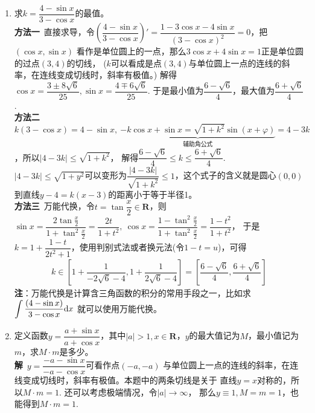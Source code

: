 \begin{enumerate}[label={【\textbf{例\thechapter.\arabic*}】},
 leftmargin=\inteval{\myenumleftmargin}pt,
 itemsep=\inteval{\myenumitempsep}pt,
 itemindent=\inteval{\myenumitemindent}pt]
\item \label{分式三角求值域} 求$ k=\dfrac{4-\sin x}{3-\cos x} $的最值。\\
\textbf{方法一}\ 直接求导，令$ \left(\dfrac{4-\sin x}{3-\cos x}\right)'
=\dfrac{1-3\cos x-4\sin x}{(3-\cos x)^2}=0 $，把$ (\cos x,\sin x) $
看作是单位圆上的一点，那么$ 3\cos x+4\sin x=1 $正是单位圆的过点$ (3,4) $的切线，
($ k $可以看成是点$ (3,4) $与单位圆上一点的连线的斜率，在连线变成切线时，斜率有极值。)
解得$ \cos x=\dfrac{3\pm 8\sqrt{6}}{25},\sin x=\dfrac{4\mp 6\sqrt{6}}{25} $. 
于是最小值为$ \dfrac{6-\sqrt{6}}{4} $，最大值为$ \dfrac{6+\sqrt{6}}{4} $. \\
\textbf{方法二}\ $ k(3-\cos x)=4-\sin x,\ \underbrace{-k\cos x +\sin x=
    \sqrt{1+k^2}\sin(x+\varphi)}_{\text{辅助角公式}}=4-3k $，所以$ |4-3k|\leq\sqrt{1+k^2} $，
解得$ \dfrac{6-\sqrt{6}}{4}\leq k \leq \dfrac{6+\sqrt{6}}{4}  $. \\
$ |4-3k|\leq\sqrt{1+y^2} $可以变形为$ \dfrac{|4-3k|}{\sqrt{1+k^2}}
\leq 1 $，这个式子的含义就是圆心$ (0,0) $到直线$ y-4=k(x-3) $的距离小于等于半径1。\\
\textbf{方法三}\ 万能代换，令$ t=\tan\dfrac{x}{2}\in \textbf{R} $，则$ \sin x=
\dfrac{2\tan\frac{x}{2}}{1+\tan^2\frac{x}{2}}=\dfrac{2t}{1+t^2},\ \cos x=\dfrac{1-\tan^2\frac{x}{2}}{1+\tan^2\frac{x}{2}}=\dfrac{1-t^2}{1+t^2} $，
于是$ k=1+\dfrac{1-t}{2t^2+1} $，使用判别式法或者换元法(令$ 1-t=u $)，可得
\begin{gather*}
    k\in \left[1+\dfrac{1}{-2\sqrt{6}-4}, 
    1+\dfrac{1}{2\sqrt{6}-4} \right]=\left[\dfrac{6-\sqrt{6}}{4},
    \dfrac{6+\sqrt{6}}{4}\right]
\end{gather*}
\textbf{注}：万能代换是计算含三角函数的积分的常用手段之一，比如求
$ \displaystyle{ \int\dfrac{(4-\sin x)}{3-\cos x}\mathrm{d}x } $
就可以使用万能代换。

\item 定义函数$ y=\dfrac{a+\sin x}{a+\cos x} $，其中$ |a|>1,x\in 
\textbf{R} $，$ y $的最大值记为$ M $，最小值记为$ m $，求$ M\cdot m $是多少。\\
\textbf{解}\ $ y=\dfrac{-a-\sin x}{-a-\cos x} $可看作点$ (-a,-a) $
与单位圆上一点的连线的斜率，在连线变成切线时，斜率有极值。本题中的两条切线是关于
直线$ y=x $对称的，所以$ M\cdot m=1 $. 还可以考虑极端情况，令$ |a|\to\infty $，
那么$ y\equiv 1,M=m=1 $，也能得到$ M\cdot m=1 $. 


\end{enumerate}
